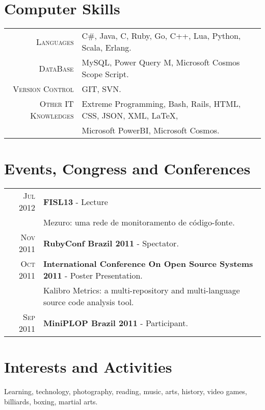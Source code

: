 \documentclass[a4paper,10pt]{article} %
\begin{document}

\section{Computer Skills}

\begin{tabular}{rl}
\textsc{Languages} & C\#, Java, C, Ruby, Go, C++, Lua, Python, Scala, Erlang.\\
\textsc{DataBase} & MySQL, Power Query M, Microsoft Cosmos Scope Script.\\
\textsc{Version Control} & GIT, SVN.\\
\textsc{Other IT Knowledges} & Extreme Programming, Bash, Rails, HTML, CSS, JSON, XML, \LaTeX,\\
                             & Microsoft PowerBI, Microsoft Cosmos.\\

\end{tabular}

\section{Events, Congress and Conferences}

\begin{tabular}{rl}
\textsc{Jul} 2012 & \textbf{FISL13} - Lecture\\
& \footnotesize{Mezuro: uma rede de monitoramento de código-fonte}.\\
\textsc{Nov} 2011 & \textbf{RubyConf Brazil 2011} - Spectator.\\
\textsc{Oct} 2011 & \textbf{International Conference On Open Source Systems 2011} - Poster Presentation.\\
& \footnotesize{Kalibro Metrics: a multi-repository and multi-language source code analysis tool}.\\
\textsc{Sep} 2011 & \textbf{MiniPLOP Brazil 2011} - Participant.


\end{tabular}


\section{Interests and Activities}

Learning, technology, photography, reading, music, arts,
history, video games, billiards, boxing, martial arts.

\end{document}
